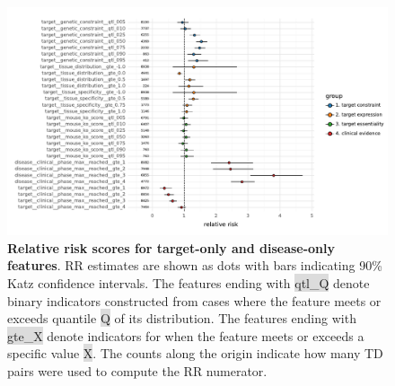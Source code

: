 \documentclass{article}
\begin{document}
\pagebreak

\begin{figure}[H]
  \centering
  \captionsetup{width=.9\linewidth}
  \includegraphics[width=1\textwidth]{relative_risk_static_features.pdf}
  \caption{
    \textbf{Relative risk scores for target-only and disease-only features}.
    RR estimates are shown as dots with bars indicating 90\% Katz confidence intervals.
    The features ending with \colorbox{Gainsboro}{qtl\_Q} denote binary indicators constructed from cases where the feature meets or exceeds quantile \colorbox{Gainsboro}{Q} of its distribution. The features ending with \colorbox{Gainsboro}{gte\_X} denote indicators for when the feature meets or exceeds a specific value \colorbox{Gainsboro}{X}. The counts along the origin indicate how many TD pairs were used to compute the RR numerator.
  }
  \label{fig:relative_risk_static_features}
\end{figure}

\pagebreak
\end{document}
